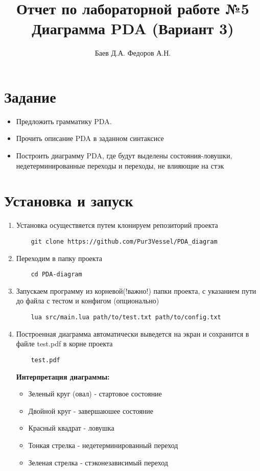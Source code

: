 \documentclass{article}
\title{Отчет по лабораторной работе №5 \\Диаграмма PDA (Вариант 3)}
\author{Баев Д.А. Федоров А.Н.}
\begin{document}
\maketitle


\section{Задание}
\begin{itemize}
  \item Предложить грамматику PDA.
  \item Прочить описание PDA в заданном синтаксисе
  \item Построить диаграмму PDA, где будут выделены состояния-ловушки, недетерминированные переходы и переходы, не влияющие на стэк
\end{itemize}


\section{Установка и запуск}

\begin{enumerate}
    \item Установка осуществяется путем клонируем репозиторий проекта
    \begin{lstlisting}
    git clone https://github.com/Pur3Vessel/PDA_diagram
    \end{lstlisting}
    \item Переходим в папку проекта
    \begin{lstlisting}
    cd PDA-diagram
    \end{lstlisting}
    \item Запускаем программу из корневой(!важно!) папки проекта, с указанием пути до файла с тестом и конфигом (опционально)
    \begin{lstlisting}
    lua src/main.lua path/to/test.txt path/to/config.txt
    \end{lstlisting}
    \item Построенная диаграмма автоматически выведется на экран и сохранится в файле test.pdf в корне проекта
    \begin{lstlisting}
    test.pdf
    \end{lstlisting}
    \textbf{Интерпретация диаграммы:}
    \begin{itemize}
        \item Зеленый круг (овал) - стартовое состояние
        \item Двойной круг - завершаюшее состояние
        \item Красный квадрат - ловушка
        \item Тонкая стрелка - недетерминированный переход
        \item Зеленая стрелка - стэконезависимый переход
    \end{itemize}
    
\end{enumerate}
\end{document}
